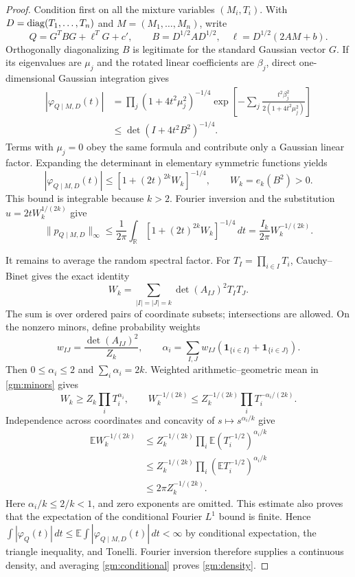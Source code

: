 \begin{proof}
Condition first on all the mixture variables $(M_i,T_i)$. With $D=\operatorname{diag}(T_1,\ldots,T_n)$ and $M=(M_1,\ldots,M_n)$, write
\[
 Q=G^T B G+\ell^TG+c',\qquad
 B=D^{1/2}AD^{1/2},\quad
 \ell=D^{1/2}(2AM+b).
\]
Orthogonally diagonalizing $B$ is legitimate for the standard Gaussian vector $G$. If its eigenvalues are $\mu_j$ and the rotated linear coefficients are $\beta_j$, direct one-dimensional Gaussian integration gives
\begin{align*}
 |\varphi_{Q\mid M,D}(t)|
 &=\prod_j(1+4t^2\mu_j^2)^{-1/4}
   \exp\left[-\sum_j\frac{t^2\beta_j^2}{2(1+4t^2\mu_j^2)}\right]\\
 &\le\det(I+4t^2B^2)^{-1/4}.
\end{align*}
Terms with $\mu_j=0$ obey the same formula and contribute only a Gaussian linear factor. Expanding the determinant in elementary symmetric functions yields
\[
 |\varphi_{Q\mid M,D}(t)|
 \le[1+(2t)^{2k}W_k]^{-1/4},\qquad W_k=e_k(B^2)>0.
\]
This bound is integrable because $k>2$. Fourier inversion and the substitution $u=2tW_k^{1/(2k)}$ give
\begin{equation}\label{gm:conditional}
 \|p_{Q\mid M,D}\|_\infty
 \le\frac1{2\pi}\int_{\mathbb R}[1+(2t)^{2k}W_k]^{-1/4}\,dt
 =\frac{I_k}{2\pi}W_k^{-1/(2k)}.
\end{equation}

It remains to average the random spectral factor. For $T_I=\prod_{i\in I}T_i$, Cauchy--Binet gives the exact identity
\begin{equation}\label{gm:minors}
 W_k=\sum_{|I|=|J|=k}\det(A_{IJ})^2T_I T_J.
\end{equation}
The sum is over ordered pairs of coordinate subsets; intersections are allowed. On the nonzero minors, define probability weights
\[
 w_{IJ}=\frac{\det(A_{IJ})^2}{Z_k},\qquad
 \alpha_i=\sum_{I,J}w_{IJ}(\mathbf1_{\{i\in I\}}+\mathbf1_{\{i\in J\}}).
\]
Then $0\le\alpha_i\le2$ and $\sum_i\alpha_i=2k$. Weighted arithmetic--geometric mean in \eqref{gm:minors} gives
\[
 W_k\ge Z_k\prod_iT_i^{\alpha_i},\qquad
 W_k^{-1/(2k)}\le Z_k^{-1/(2k)}\prod_iT_i^{-\alpha_i/(2k)}.
\]
Independence across coordinates and concavity of $s\mapsto s^{\alpha_i/k}$ give
\begin{align*}
 \mathbb E W_k^{-1/(2k)}
 &\le Z_k^{-1/(2k)}\prod_i\mathbb E(T_i^{-1/2})^{\alpha_i/k}\\
 &\le Z_k^{-1/(2k)}\prod_i(\mathbb E T_i^{-1/2})^{\alpha_i/k}\\
 &\le2\pi Z_k^{-1/(2k)}.
\end{align*}
Here $\alpha_i/k\le2/k<1$, and zero exponents are omitted. This estimate also proves that the expectation of the conditional Fourier $L^1$ bound is finite. Hence
$\int|\varphi_Q(t)|\,dt\le\mathbb E\int|\varphi_{Q\mid M,D}(t)|\,dt<\infty$
by conditional expectation, the triangle inequality, and Tonelli. Fourier inversion therefore supplies a continuous density, and averaging \eqref{gm:conditional} proves \eqref{gm:density}.


\end{proof}
